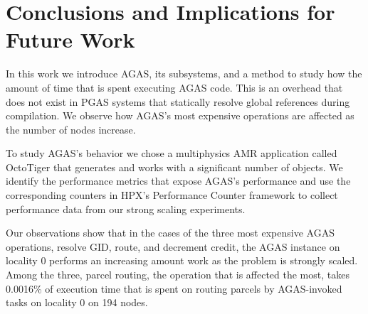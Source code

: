 \section{Conclusions and Implications for Future Work}
\label{conclusions}

%

In this work we introduce AGAS, its subsystems, and a method to study how the
amount of time that is spent executing AGAS code. This is an overhead that does
not exist in PGAS systems that statically resolve global references during
compilation. We observe how AGAS's most expensive operations are affected as
the number of nodes increase.

To study AGAS's behavior we chose a multiphysics AMR application called
OctoTiger that generates and works with a significant number of objects. We
identify the performance metrics that expose AGAS's performance and use the
corresponding counters in HPX's Performance Counter framework to collect
performance data from our strong scaling experiments.

Our observations show that in the cases of the three most expensive AGAS operations, resolve
GID, route, and decrement credit, the AGAS instance on locality 0 performs an
increasing amount work as the problem is strongly scaled. Among the three, parcel routing, the operation that is
affected the most, takes 0.0016\% of
execution time that is spent on routing parcels by AGAS-invoked tasks on locality 0 on
194 nodes. 

